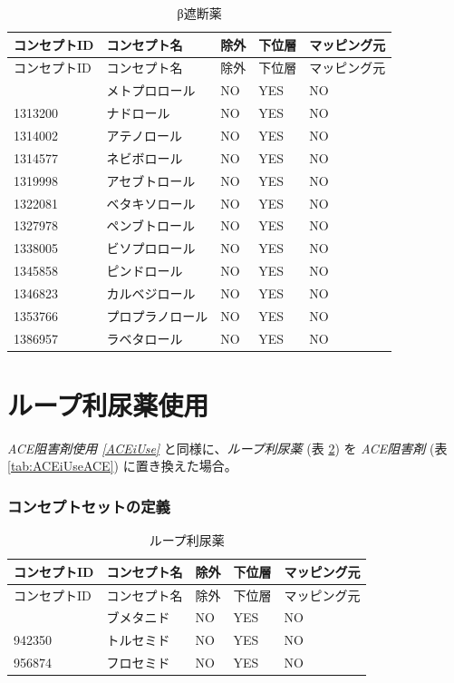 \documentclass[
  11pt]{book}
\theoremstyle{definition}
\theoremstyle{definition}
\theoremstyle{definition}
\theoremstyle{definition}
\theoremstyle{remark}
\begin{document}
\begin{longtable}[]{@{}lllll@{}}
\caption{\label{tab:BBUseBB} β遮断薬}\tabularnewline
\toprule\noalign{}
コンセプトID & コンセプト名 & 除外 & 下位層 & マッピング元 \\
\midrule\noalign{}
\endfirsthead
\toprule\noalign{}
コンセプトID & コンセプト名 & 除外 & 下位層 & マッピング元 \\
\midrule\noalign{}
\endhead
\bottomrule\noalign{}
\endlastfoot
1307046 & メトプロロール & NO & YES & NO \\
1313200 & ナドロール & NO & YES & NO \\
1314002 & アテノロール & NO & YES & NO \\
1314577 & ネビボロール & NO & YES & NO \\
1319998 & アセブトロール & NO & YES & NO \\
1322081 & ベタキソロール & NO & YES & NO \\
1327978 & ペンブトロール & NO & YES & NO \\
1338005 & ビソプロロール & NO & YES & NO \\
1345858 & ピンドロール & NO & YES & NO \\
1346823 & カルベジロール & NO & YES & NO \\
1353766 & プロプラノロール & NO & YES & NO \\
1386957 & ラベタロール & NO & YES & NO \\
\end{longtable}

\section{ループ利尿薬使用}\label{DLoopUse}

\emph{ACE阻害剤使用 \ref{ACEiUse}} と同様に、\emph{ループ利尿薬} (表 \ref{tab:DLoopUseDLoops}) を \emph{ACE阻害剤} (表 \ref{tab:ACEiUseACE}) に置き換えた場合。

\subsubsection*{コンセプトセットの定義}\label{ux30b3ux30f3ux30bbux30d7ux30c8ux30bbux30c3ux30c8ux306eux5b9aux7fa9-4}

\begin{longtable}[]{@{}lllll@{}}
\caption{\label{tab:DLoopUseDLoops} ループ利尿薬}\tabularnewline
\toprule\noalign{}
コンセプトID & コンセプト名 & 除外 & 下位層 & マッピング元 \\
\midrule\noalign{}
\endfirsthead
\toprule\noalign{}
コンセプトID & コンセプト名 & 除外 & 下位層 & マッピング元 \\
\midrule\noalign{}
\endhead
\bottomrule\noalign{}
\endlastfoot
932745 & ブメタニド & NO & YES & NO \\
942350 & トルセミド & NO & YES & NO \\
956874 & フロセミド & NO & YES & NO \\
\end{longtable}
\end{document}
